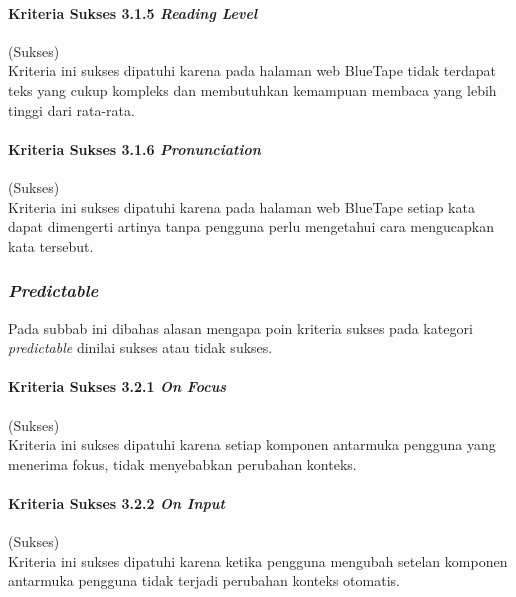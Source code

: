 \paragraph{Kriteria Sukses 3.1.5 \textit{Reading Level}}
\label{par:kepatuhan_bluetape_kriteria_sukses_3.1.5}
(Sukses)\\

Kriteria ini sukses dipatuhi karena pada halaman web BlueTape tidak terdapat teks yang cukup kompleks dan membutuhkan kemampuan membaca yang lebih tinggi dari rata-rata.

\paragraph{Kriteria Sukses 3.1.6 \textit{Pronunciation}}
\label{par:kepatuhan_bluetape_kriteria_sukses_3.1.6}
(Sukses)\\

Kriteria ini sukses dipatuhi karena pada halaman web BlueTape setiap kata dapat dimengerti artinya tanpa pengguna perlu mengetahui cara mengucapkan kata tersebut.

\subsubsection{\textit{Predictable}}
\label{subsubsec:kepatuhan_bluetape_predictable}
Pada subbab ini dibahas alasan mengapa poin kriteria sukses pada kategori \textit{predictable} dinilai sukses atau tidak sukses.

\paragraph{Kriteria Sukses 3.2.1 \textit{On Focus}}
\label{par:kepatuhan_bluetape_kriteria_sukses_3.2.1}
(Sukses)\\

Kriteria ini sukses dipatuhi karena setiap komponen antarmuka pengguna yang menerima fokus, tidak menyebabkan perubahan konteks.

\paragraph{Kriteria Sukses 3.2.2 \textit{On Input}}
\label{par:kepatuhan_bluetape_kriteria_sukses_3.2.2}
(Sukses)\\

Kriteria ini sukses dipatuhi karena ketika pengguna mengubah setelan komponen antarmuka pengguna tidak terjadi perubahan konteks otomatis.

